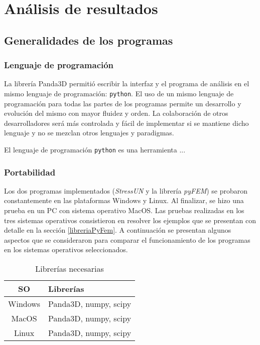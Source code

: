 \chapter{Análisis de resultados}
\label{chap:analisis_resultados}

\section{Generalidades de los programas}

\subsection{Lenguaje de programación}

La librería Panda3D permitió escribir la interfaz y el programa de análisis en el mismo lenguaje de programación: \texttt{python}. El uso de un mismo lenguaje de programación para todas las partes de los programas permite un desarrollo y evolución del mismo con mayor fluidez y orden. La colaboración de otros desarrolladores será más controlada y fácil de implementar si se mantiene dicho lenguaje y no se mezclan otros lenguajes y paradigmas. 

El lenguaje de programación \texttt{python} es una herramienta ...

\subsection{Portabilidad}

Los dos programas implementados (\textit{StressUN} y la librería \textit{pyFEM}) se probaron constantemente en las plataformas Windows y Linux. Al finalizar, se hizo una prueba en un PC con sistema operativo MacOS. Las pruebas realizadas en los tres sistemas operativos consistieron en resolver los ejemplos que se presentan con detalle en la sección \ref{libreriaPyFem}. A continuación se presentan algunos aspectos que se consideraron para comparar el funcionamiento de los programas en los sistemas operativos seleccionados.

\begin{table}[htbp]
    \centering
    \begin{tabular}{c|p{6cm}}
        \hline 
        SO & Librerías \\
        \hline 
        Windows & Panda3D, numpy, scipy \\
        MacOS & Panda3D, numpy, scipy \\
        Linux & Panda3D, numpy, scipy \\
        \hline 
    \end{tabular}
    \caption{Librerías necesarias}
    \label{tab:my_label}
\end{table}


